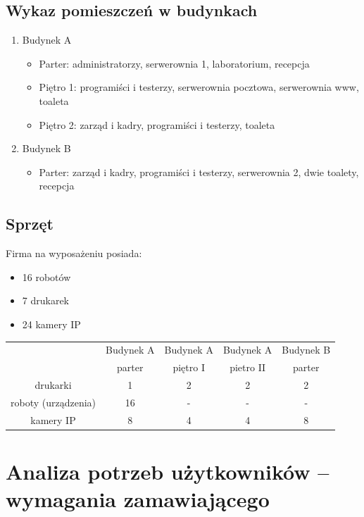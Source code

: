 \documentclass{article}
\begin{document}
\subsection{Wykaz pomieszczeń w budynkach}
\begin{enumerate}
	\item Budynek A
	\begin{itemize}
		\item Parter: administratorzy, serwerownia 1, laboratorium, recepcja
		\item Piętro 1: programiści i testerzy, serwerownia pocztowa, serwerownia www, toaleta
		\item Piętro 2: zarząd i kadry, programiści i testerzy, toaleta
	\end{itemize}
	\item Budynek B
		\begin{itemize}
		\item Parter: zarząd i kadry, programiści i testerzy, serwerownia 2, dwie toalety, recepcja
	\end{itemize}
\end{enumerate}
\subsection{Sprzęt}
Firma na wyposażeniu posiada:
\begin{itemize}
	\item 16 robotów
	\item 7 drukarek
	\item 24 kamery IP
\end{itemize}
\begin{tabular}{|c|c|c|c|c|}\hline
	\centering
	& Budynek A & Budynek A & Budynek A & 	Budynek B 	\\
	\centering
 & parter & piętro I & pietro II & parter \\
 \hline
drukarki & 1 & 2 & 2 & 2\\
\hline
roboty (urządzenia) & 16 & - & - & - \\
\hline
kamery IP & 8 & 4 & 4 & 8 \\
\hline
\end{tabular}
\newpage
\section{Analiza potrzeb użytkowników – wymagania zamawiającego}
\end{document}
